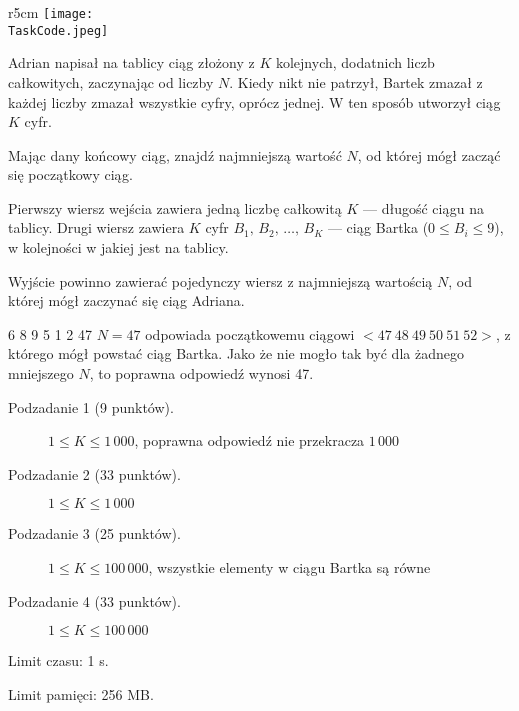 \documentclass{boi2014-pl}
\renewcommand{\TaskCode}{sequence}
\begin{document}
    \begin{wrapfigure}[5]{r}{5cm}
        \vspace{-24pt}
		\texttt{[image: \\TaskCode.jpeg]}
	\end{wrapfigure}

    Adrian napisał na tablicy ciąg złożony z $K$ kolejnych, dodatnich liczb całkowitych, zaczynając od liczby $N$.
    Kiedy nikt nie patrzył, Bartek zmazał z każdej liczby zmazał wszystkie cyfry, oprócz jednej.
    W ten sposób utworzył ciąg $K$ cyfr.

    \Task

    Mając dany końcowy ciąg, znajdź najmniejszą wartość $N$, od której mógł zacząć się początkowy ciąg.

    \Input

    Pierwszy wiersz wejścia zawiera jedną liczbę całkowitą $K$ --- długość ciągu na tablicy.
    Drugi wiersz zawiera $K$ cyfr $B_1,\, B_2 ,\, \ldots ,\, B_K$ --- ciąg Bartka ($0 \le B_i \le 9$), w kolejności w jakiej jest na tablicy.
    
    \Output

    Wyjście powinno zawierać pojedynczy wiersz z najmniejszą wartością $N$, od której mógł zaczynać się ciąg Adriana.
    
    \Example

    \example
    {
        6 8 9 5 1 2
    }
    {
        47
    }
    {
        $N = 47$ odpowiada początkowemu ciągowi $<47\ 48\ 49\ 50\ 51\ 52>$, z którego mógł powstać ciąg Bartka. Jako że nie mogło tak być dla żadnego mniejszego $N$, to poprawna odpowiedź wynosi 47.
    }

\Scoring

\begin{description}
    \item[Podzadanie 1 (9 punktów).] $1 \le K \le 1\,000$, poprawna odpowiedź nie przekracza $1\,000$
    \item[Podzadanie 2 (33 punktów).] $1 \le K \le 1\,000$
    \item[Podzadanie 3 (25 punktów).] $1 \le K \le 100\,000$, wszystkie elementy w ciągu Bartka są równe
    \item[Podzadanie 4 (33 punktów).] $1 \le K \le 100\,000$
\end{description}

\Constraints

Limit czasu: 1 s.

Limit pamięci: 256 MB.
\end{document}
